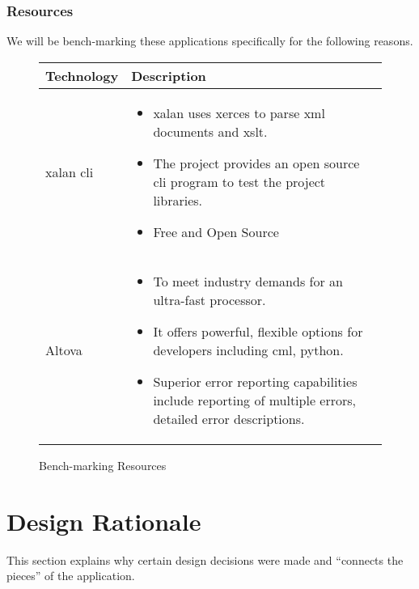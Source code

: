 \subsubsection{Resources}

We will be bench-marking these applications specifically for the following reasons.

\begin{figure}
  \centering
  \begin{tabular}{ | l | p{10cm} |}
    \hline
    Technology & Description  \\ \hline
    \gls{xalan} \gls{cli}&
    \begin{itemize}
      \item \gls{xalan} uses \gls{xerces} to parse \gls{xml} documents and \gls{xslt}.
      \item The project provides an open source \gls{cli} program to test the project libraries.
      \item Free and Open Source
    \end{itemize}\\ \hline
    Altova &
    \begin{itemize}
      \item To meet industry demands for an ultra-fast processor.
      \item It offers powerful, flexible options for developers including cml, python.
      \item Superior error reporting capabilities include reporting of multiple errors, detailed error descriptions.
    \end{itemize} \\ \hline
  \end{tabular}
  \caption{Bench-marking Resources}
\end{figure}


\section{Design Rationale}

This section explains why certain design decisions were made and ``connects the pieces'' of the application.


